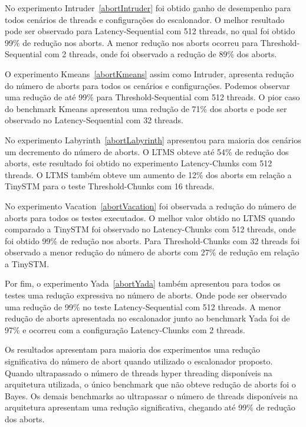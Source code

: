 \documentclass[diss,capa]{texufpel}
\begin{document}
No experimento Intruder~\ref{abortIntruder} foi obtido ganho de desempenho para todos cenários de threads e configurações do escalonador. O melhor resultado pode ser observado para Latency-Sequential com 512 threads, no qual foi obtido 99\% de redução nos aborts. A menor redução nos aborts ocorreu para Threshold-Sequential com 2 threads, onde foi observado a redução de 89\% dos aborts.

O experimento Kmeans~\ref{abortKmeans} assim como Intruder, apresenta redução do número de aborts para todos os cenários e configurações. Podemos observar uma redução de até 99\% para Threshold-Sequential com 512 threads. O pior caso do benchmark Kmeans apresentou uma redução de 71\% dos aborts e pode ser observado no Latency-Sequential com 32 threads.



No experimento Labyrinth~\ref{abortLabyrinth} apresentou para maioria dos cenários um decremento do número de aborts. O LTMS obteve até 54\% de redução dos aborts, este resultado foi obtido no experimento Latency-Chunks com 512 threads. O LTMS também obteve um aumento de 12\% dos aborts em relação a TinySTM para o teste Threshold-Chunks com 16 threads.

No experimento Vacation~\ref{abortVacation} foi observada a redução do número de aborts para todos os testes executados. O melhor valor obtido no LTMS quando comparado a TinySTM foi observado no Latency-Chunks com 512 threads, onde foi obtido 99\% de redução nos aborts. Para Threshold-Chunks com 32 threads foi observado a menor redução do número de aborts com 27\% de redução em relação a TinySTM.

Por fim, o experimento Yada~\ref{abortYada} também apresentou para todos os testes uma redução expressiva no número de aborts. Onde pode ser observado uma redução de 99\% no teste Latency-Sequential com 512 threads. A menor redução de aborts apresentada no escalonador junto ao benchmark Yada foi de 97\% e ocorreu com a configuração Latency-Chunks com 2 threads.

Os resultados apresentam para maioria dos experimentos uma redução significativa do número de abort quando utilizado o escalonador proposto. Quando ultrapassado o número de threads hyper threading disponíveis na arquitetura utilizada, o único benchmark que não obteve redução de aborts foi o Bayes. Os demais benchmarks ao ultrapassar o número de threads disponíveis na arquitetura apresentam uma redução significativa, chegando até 99\% de redução dos aborts.
\end{document}
